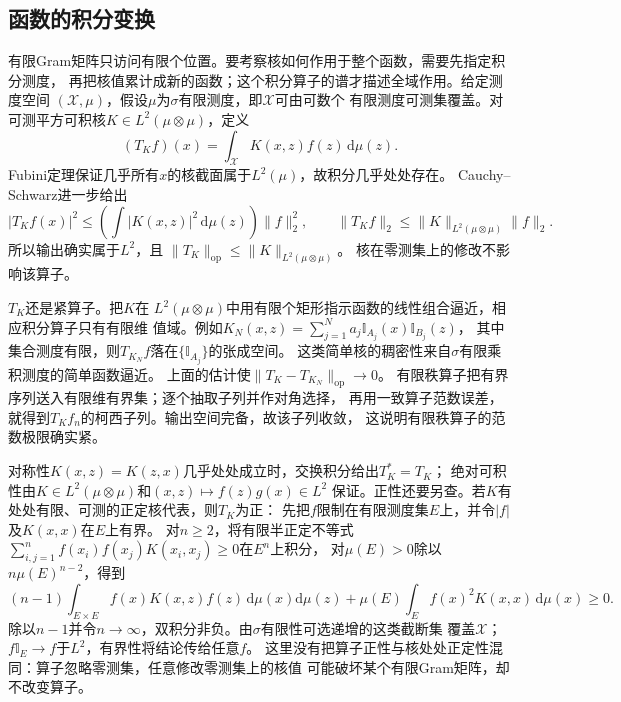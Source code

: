 \subsection{函数的积分变换}
\label{sec:functional-integral-transforms}
\label{sec:functional-kernel-spectrum-regularization}

有限Gram矩阵只访问有限个位置。要考察核如何作用于整个函数，需要先指定积分测度，
再把核值累计成新的函数；这个积分算子的谱才描述全域作用。给定测度空间
$(\mathcal X,\mu)$，假设$\mu$为$\sigma$有限测度，即$\mathcal X$可由可数个
有限测度可测集覆盖。对可测平方可积核$K\in L^2(\mu\otimes\mu)$，定义
\begin{equation}
 (T_Kf)(x)=\int_{\mathcal X}K(x,z)f(z)\,\mathrm d\mu(z).
 \label{eq:functional-kernel-integral-operator}
\end{equation}
Fubini定理保证几乎所有$x$的核截面属于$L^2(\mu)$，故积分几乎处处存在。
Cauchy--Schwarz进一步给出
\[
 |T_Kf(x)|^2
 \leq\left(\int|K(x,z)|^2\,\mathrm d\mu(z)\right)\lVert f\rVert_2^2,\qquad
 \lVert T_Kf\rVert_2\leq\lVert K\rVert_{L^2(\mu\otimes\mu)}\lVert f\rVert_2.
\]
所以输出确实属于$L^2$，且
$\lVert T_K\rVert_{\mathrm{op}}\leq\lVert K\rVert_{L^2(\mu\otimes\mu)}$。
核在零测集上的修改不影响该算子。

$T_K$还是紧算子。把$K$在
$L^2(\mu\otimes\mu)$中用有限个矩形指示函数的线性组合逼近，相应积分算子只有有限维
值域。例如$K_N(x,z)=\sum_{j=1}^N a_j\mathbb I_{A_j}(x)\mathbb I_{B_j}(z)$，
其中集合测度有限，则$T_{K_N}f$落在$\{\mathbb I_{A_j}\}$的张成空间。
这类简单核的稠密性来自$\sigma$有限乘积测度的简单函数逼近。
上面的估计使$\lVert T_K-T_{K_N}\rVert_{\mathrm{op}}\to0$。
有限秩算子把有界序列送入有限维有界集；逐个抽取子列并作对角选择，
再用一致算子范数误差，就得到$T_Kf_n$的柯西子列。输出空间完备，故该子列收敛，
这说明有限秩算子的范数极限确实紧。

对称性$K(x,z)=K(z,x)$几乎处处成立时，交换积分给出$T_K^*=T_K$；
绝对可积性由$K\in L^2(\mu\otimes\mu)$和$(x,z)\mapsto f(z)g(x)\in L^2$
保证。正性还要另查。若$K$有处处有限、可测的正定核代表，则$T_K$为正：
先把$f$限制在有限测度集$E$上，并令$|f|$及$K(x,x)$在$E$上有界。
对$n\geq2$，将有限半正定不等式
$\sum_{i,j=1}^n f(x_i)f(x_j)K(x_i,x_j)\geq0$在$E^n$上积分，
对$\mu(E)>0$除以$n\mu(E)^{n-2}$，得到
\[
 (n-1)\int_{E\times E}f(x)K(x,z)f(z)\,\mathrm d\mu(x)\mathrm d\mu(z)
 +\mu(E)\int_E f(x)^2K(x,x)\,\mathrm d\mu(x)\geq0.
\]
除以$n-1$并令$n\to\infty$，双积分非负。由$\sigma$有限性可选递增的这类截断集
覆盖$\mathcal X$；$f\mathbb I_E\to f$于$L^2$，有界性将结论传给任意$f$。
这里没有把算子正性与核处处正定性混同：算子忽略零测集，任意修改零测集上的核值
可能破坏某个有限Gram矩阵，却不改变算子。


